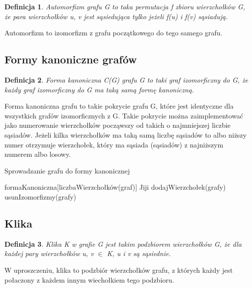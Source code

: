 \documentclass[11pt]{article}
\newtheorem{definition}{Definicja}[section]
\begin{document}
  \begin{definition}
    Automorfizm grafu G to taka permutacja f zbioru wierzchołków G, że para wierzchołków u, v jest sąsiedująca tylko jeżeli f(u) i f(v) sąsiadują. 
  \end{definition}
  Automorfizm to izomorfizm z grafu początkowego do tego samego grafu. 

  \subsection{Formy kanoniczne grafów}

  \begin{definition}
    Forma kanoniczna C(G) grafu G to taki graf izomorficzny do G, że każdy graf izomorficzny do G ma taką samą formę kanoniczną. 
  \end{definition}
  Forma kanoniczna grafu to takie pokrycie grafu G, 
  które jest identyczne dla wszystkich grafów izomorficznych z G. Takie pokrycie można zaimplementować
   jako numerowanie wierzchołków począwszy od takich o najmniejszej liczbie sąsiadów. 
   Jeżeli kilka wierzchołków ma taką samą liczbę sąsiadów to albo niższy numer otrzymuje wierzchołek, 
   który ma sąsiada (sąsiadów) z najniższym numerem albo losowy. 

   \begin{algorithm}
    \caption{Sprowadzanie grafu do formy kanonicznej}
    \begin{algorithmic}
    \STATE formaKanoniczna[liczbaWierzchołków(graf)]
        \STATE Jiji
      \ENDWHILE
    \ENDFOR
      \STATE dodajWierzchołek(grafy)
      \STATE usunIzomorfizmy(grafy)
    \ENDWHILE
    \end{algorithmic}
    \end{algorithm}

   \subsection{Klika}
   \begin{definition}
    Klika K w grafie G jest takim podzbiorem wierzchołków G, że dla każdej pary wierzchołków u, v $\in$ K, u i v są sąsiednie. 
   \end{definition}
   
   W uproszczeniu, klika to podzbiór wierzchołków grafu, z których każdy jest połaczony z każdem innym wiechołkiem tego podzbioru.
   \begin{figure}[h]
   \centering
     \caption{}
  \end{figure}
\end{document}
